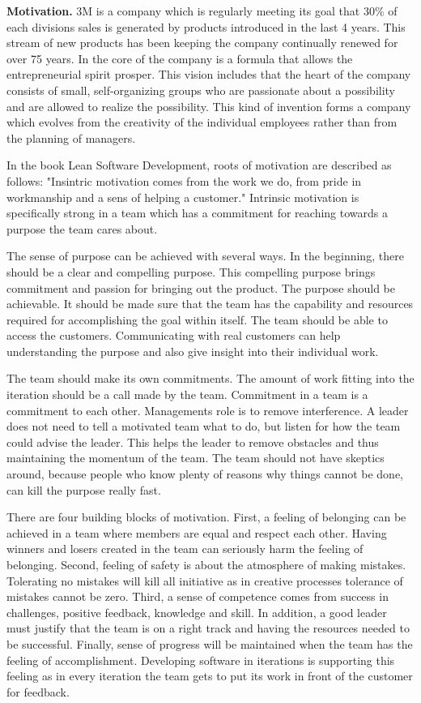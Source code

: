
\textbf{Motivation.} 3M is a company which is regularly meeting its goal that 30\% of each divisions sales is generated by products introduced in the last 4 years. This stream of new products has been keeping the company continually renewed for over 75 years. In the core of the company is a formula that allows the entrepreneurial spirit prosper. This vision includes that the heart of the company consists of small, self-organizing groups who are passionate about a possibility and are allowed to realize the possibility. This kind of invention forms a company which evolves from the creativity of the individual employees rather than from the planning of managers.

In the book Lean Software Development, roots of motivation are described as follows: "Insintric motivation comes from the work we do, from pride in workmanship and a sens of helping a customer." Intrinsic motivation is specifically strong in a team which has a commitment for reaching towards a purpose the team cares about. 

The sense of purpose can be achieved with several ways. In the beginning, there should be a clear and compelling purpose. This compelling purpose brings commitment and passion for bringing out the product. The purpose should be achievable. It should be made sure that the team has the capability and resources required for accomplishing the goal within itself. The team should be able to access the customers. Communicating with real customers can help understanding the purpose and also give insight into their individual work.

The team should make its own commitments. The amount of work fitting into the iteration should be a call made by the team. Commitment in a team is a commitment to each other. Managements role is to remove interference. A leader does not need to tell a motivated team what to do, but listen for how the team could advise the leader. This helps the leader to remove obstacles and thus maintaining the momentum of the team. The team should not have skeptics around, because people who know plenty of reasons why things cannot be done, can kill the purpose really fast.

There are four building blocks of motivation. First, a feeling of belonging can be achieved in a team where members are equal and respect each other. Having winners and losers created in the team can seriously harm the feeling of belonging. Second, feeling of safety is about the atmosphere of making mistakes. Tolerating no mistakes will kill all initiative as in creative processes tolerance of mistakes cannot be zero. Third, a sense of competence comes from success in challenges, positive feedback, knowledge and skill. In addition, a good leader must justify that the team is on a right track and having the resources needed to be successful. Finally, sense of progress will be maintained when the team has the feeling of accomplishment. Developing software in iterations is supporting this feeling as in every iteration the team gets to put its work in front of the customer for feedback.

